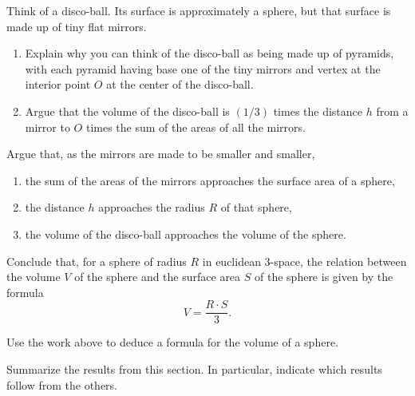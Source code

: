 \documentclass[hints,handout,noauthor,nooutcomes,12pt]{ximera}
\begin{document}
Think of a disco-ball. Its surface is approximately a sphere, but that
surface is made up of tiny flat mirrors.

\begin{problem}\hfil
\begin{enumerate}
\item Explain why you can think of the disco-ball as being made up of
  pyramids, with each pyramid having base one of the tiny mirrors and
  vertex at the interior point $O$ at the center of the disco-ball.
\item Argue that the volume of the disco-ball is $\left( 1/3\right) $
  times the distance $h$ from a mirror to $O$ times the sum of the
  areas of all the mirrors.
\end{enumerate}
\end{problem}

\begin{problem}
Argue that, as the mirrors are made to be smaller and smaller,
\begin{enumerate}
\item the sum of the areas of the mirrors approaches the surface area of a sphere,
\item the distance $h$ approaches the radius $R$ of that sphere,
\item the volume of the disco-ball approaches the volume of the sphere.
\end{enumerate}
Conclude that, for a sphere of radius $R$ in euclidean $3$-space, the relation
between the volume $V$ of the sphere and the surface area $S$ of the sphere is
given by the formula%
\[
V=\frac{R\cdot S}{3}.
\]
\end{problem}

\begin{problem}
Use the work above to deduce a formula for the volume of a sphere.
\end{problem}




\begin{problem}
Summarize the results from this section. In particular, indicate which
results follow from the others.
\begin{freeResponse}
\end{freeResponse}
\end{problem}
\end{document}
